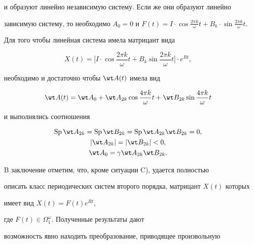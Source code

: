 и образуют линейно независимую систему. Если же они образуют линейно 


зависимую систему, то необходимо $A_0=0$ и $F(t)=I\cdot \cos\frac{2\pi 


k}{\omega}t+B_k\cdot\sin\frac{2\pi k}{\omega}t$. 


 


 


\begin{thm} 


Для того чтобы линейная система имела матрицант вида 


$$ 


X(t)=\bigg[I\cdot\cos\frac{2\pi k}{\omega}t+ 


B_k\sin\frac{2\pi k}{\omega}t\bigg]\cdot e^{Rt}, 


$$ 


необходимо и достаточно чтобы $\wt A(t)$ имела вид 


$$ 


\wt A(t)=\wt A_0+\wt A_{2k}\cos\frac{4\pi k}{\omega}t+ 


\wt B_{2k}\sin\frac{4\pi k}{\omega}t 


$$ 


и выполнялись соотношения 


\begin{gather*} 


\SP\wt A_{2k}=\SP\wt B_{2k}=\SP\wt A_{2k}\wt B_{2k}=0,\\ 


|\wt A_{2k}|=|\wt B_{2k}|<0, \\ 


\wt A_0=\gamma\wt A_{2k}\wt B_{2k}. 


\end{gather*} 


\end{thm} 


 


 


B заключение отметим, что, кроме ситуации C), удается полностью 


описать класс периодических систем второго порядка, матрицант $X(t)$ которых 


имеет вид $X(t)=F(t)e^{Rt}$, 


где $F(t)\in\Omega^\omega_1$. Полученные результаты дают 


возможность явно находить преобразование, приводящее произвольную


